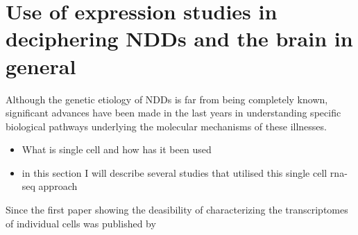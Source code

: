 \documentclass[12pt]{article}
\begin{document}
    \section{Use of expression studies in deciphering NDDs and the brain in general}
    Although the genetic etiology of NDDs is far from being completely known, significant advances have been made in the last years in understanding specific biological pathways underlying the molecular mechanisms of these illnesses. 
    \begin{itemize}
        \item What is single cell and how has it been used 
        \item in this section I will describe several studies that utilised this single cell rna-seq approach 
    \end{itemize}

Since the first paper showing the deasibility of characterizing the transcriptomes of individual cells was published by 
\end{document}
